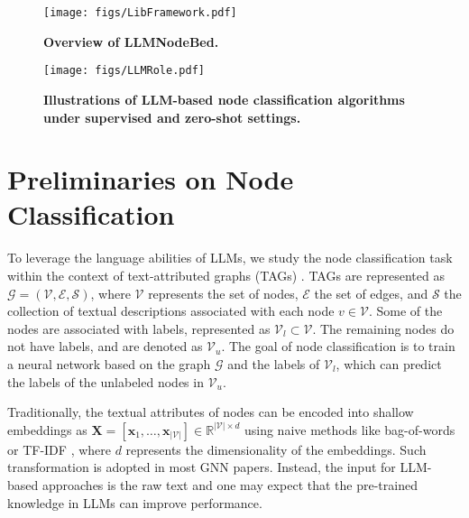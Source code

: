 \begin{figure}[!t]
    \centering
    \texttt{[image: figs/LibFramework.pdf]}
    \vspace*{-10pt}
    \caption{\textbf{Overview of LLMNodeBed.}}
    \vspace*{-10pt}
    \label{fig:system_implementation}
\end{figure}



\begin{figure*}[!t]
    \centering
    \texttt{[image: figs/LLMRole.pdf]}
    \vspace*{-0.2cm}
    \caption{\textbf{Illustrations of LLM-based node classification algorithms under supervised and zero-shot settings.}}
    \vspace*{-0.2cm}
    \label{fig:llm_role}
\end{figure*}


\section{Preliminaries on Node Classification}
To leverage the language abilities of LLMs, we study the node classification task within the context of text-attributed graphs (TAGs) \cite{ma2021deep}. TAGs are represented as $\mathcal{G} = (\mathcal{V}, \mathcal{E}, \mathcal{S})$, where $\mathcal{V}$ represents the set of nodes, $\mathcal{E}$ the set of edges, and $\mathcal{S}$ the collection of textual descriptions associated with each node $v \in \mathcal{V}$. Some of the nodes are associated with labels, represented as $\mathcal{V}_l \subset \mathcal{V}$. The remaining nodes do not have labels, and are denoted as $\mathcal{V}_u$. The goal of node classification is to train a neural network based on the graph $\mathcal{G}$ and the labels of $\mathcal{V}_l$, which can predict the labels of the unlabeled nodes in $\mathcal{V}_u$.

Traditionally, the textual attributes of nodes can be encoded into shallow embeddings as $\bm{X} = [\bm{x}_1, \ldots, \bm{x}_{|\mathcal{V}|}] \in \mathbb{R}^{|\mathcal{V}| \times d}$ using naive methods like bag-of-words or TF-IDF \cite{Salton1988TermWeightingAI}, where $d$ represents the dimensionality of the embeddings. Such transformation is adopted in most GNN papers. Instead, the input for LLM-based approaches is the raw text and one may expect that the pre-trained knowledge in LLMs can improve performance.







